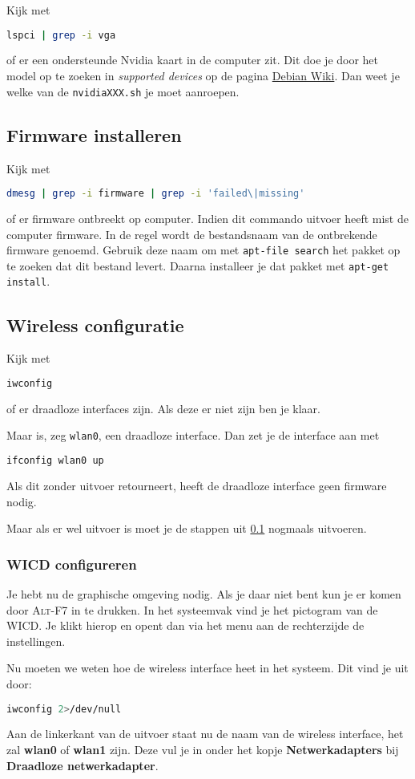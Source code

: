 Kijk met 
\begin{lstlisting}[language=bash]
lspci | grep -i vga
\end{lstlisting}
of er een ondersteunde Nvidia kaart in de computer zit. Dit doe je door het model op te zoeken in \textit{supported devices} op de pagina \href{https://wiki.debian.org/NvidiaGraphicsDrivers}{Debian Wiki}. Dan weet je welke van de  \texttt{nvidiaXXX.sh} je moet aanroepen.

\subsection{Firmware installeren}
\label{ssec:Firmware}
Kijk met 
\begin{lstlisting}[language=bash]
dmesg | grep -i firmware | grep -i 'failed\|missing'
\end{lstlisting}
of er firmware ontbreekt op computer.
Indien dit commando uitvoer heeft mist de computer firmware. In de regel wordt de bestandsnaam van de ontbrekende firmware genoemd. Gebruik deze naam om met \texttt{apt-file search} het pakket op te zoeken dat dit bestand levert. Daarna installeer je dat pakket met \texttt{apt-get install}.

\subsection{Wireless configuratie}
Kijk met 
\begin{lstlisting}[language=bash]
iwconfig
\end{lstlisting}
of er draadloze interfaces zijn. Als deze er niet zijn ben je klaar. 

Maar is, zeg \texttt{wlan0}, een draadloze interface. Dan zet je de interface aan met 
\begin{lstlisting}[language=bash]
ifconfig wlan0 up
\end{lstlisting}
Als dit zonder uitvoer retourneert, heeft de draadloze interface geen firmware nodig.

Maar als er wel uitvoer is moet je de stappen uit \ref{ssec:Firmware} nogmaals uitvoeren.
\subsubsection{WICD configureren}
Je hebt nu de graphische omgeving nodig. Als je daar niet bent kun je er komen door \textsc{Alt-F7} in te drukken.
In het systeemvak vind je het pictogram van de WICD. Je klikt hierop en opent dan via het menu aan de rechterzijde de instellingen. 

Nu moeten we weten hoe de wireless interface heet in het systeem. Dit vind je uit door:
\begin{lstlisting}[language=bash]
iwconfig 2>/dev/null
\end{lstlisting}
Aan de linkerkant van de uitvoer staat nu de naam van de wireless interface, het zal \textbf{wlan0} of  \textbf{wlan1} zijn. Deze vul je in onder het kopje \textbf{Netwerkadapters} bij \textbf{Draadloze netwerkadapter}.
